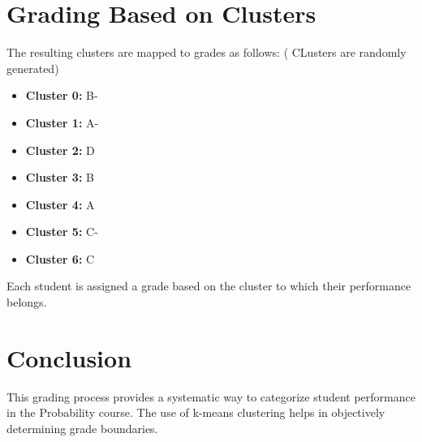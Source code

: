 \documentclass{article}
\begin{document}
\section{\textcolor{mygold}{Grading Based on Clusters}}

The resulting clusters are mapped to grades as follows: ( CLusters are randomly generated)

\begin{itemize}
    \item \textbf{Cluster 0:} B-
    \item \textbf{Cluster 1:} A-
    \item \textbf{Cluster 2:} D
    \item \textbf{Cluster 3:} B
    \item \textbf{Cluster 4:} A
    \item \textbf{Cluster 5:} C-
    \item \textbf{Cluster 6:} C
\end{itemize}

Each student is assigned a grade based on the cluster to which their performance belongs.

\section{\textcolor{mygold}{Conclusion}}

This grading process provides a systematic way to categorize student performance in the Probability course. The use of k-means clustering helps in objectively determining grade boundaries.
\end{document}

